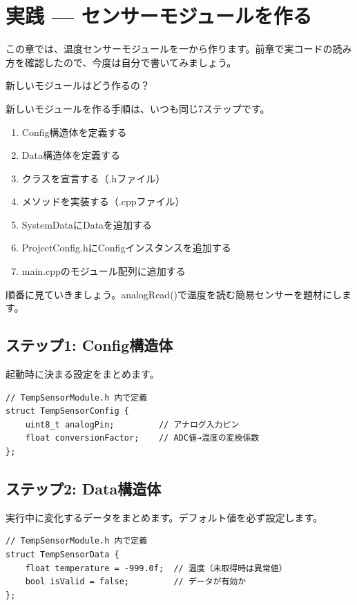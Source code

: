 \section{実践 — センサーモジュールを作る}

この章では、温度センサーモジュールを一から作ります。前章で実コードの読み方を確認したので、今度は自分で書いてみましょう。

\begin{qabox}{新しいモジュールはどう作るの？}

新しいモジュールを作る手順は、いつも同じ7ステップです。

\begin{enumerate}
  \item Config構造体を定義する
  \item Data構造体を定義する
  \item クラスを宣言する（.hファイル）
  \item メソッドを実装する（.cppファイル）
  \item SystemDataにDataを追加する
  \item ProjectConfig.hにConfigインスタンスを追加する
  \item main.cppのモジュール配列に追加する
\end{enumerate}

順番に見ていきましょう。analogRead()で温度を読む簡易センサーを題材にします。

\subsection{ステップ1: Config構造体}

起動時に決まる設定をまとめます。

\begin{lstlisting}
// TempSensorModule.h 内で定義
struct TempSensorConfig {
    uint8_t analogPin;         // アナログ入力ピン
    float conversionFactor;    // ADC値→温度の変換係数
};
\end{lstlisting}

\subsection{ステップ2: Data構造体}

実行中に変化するデータをまとめます。デフォルト値を必ず設定します。

\begin{lstlisting}
// TempSensorModule.h 内で定義
struct TempSensorData {
    float temperature = -999.0f;  // 温度（未取得時は異常値）
    bool isValid = false;         // データが有効か
};
\end{lstlisting}


\end{qabox}
